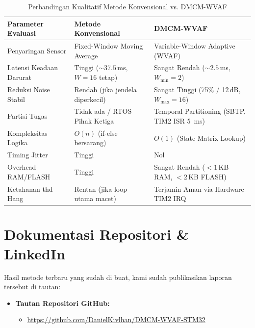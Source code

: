 \documentclass[11pt,a4paper]{article}
\begin{document}
\begin{longtable}
\begin{table}[H]
\centering
\caption{Perbandingan Kualitatif Metode Konvensional vs. DMCM-WVAF}\label{tab:perbandingan}
\vspace{0.2cm}
\begin{tabular}{|>{\centering\arraybackslash}m{4.2cm}|>{\raggedright\arraybackslash}m{6.4cm}|>{\raggedright\arraybackslash}m{6.4cm}|}
\hline
\textbf{Parameter Evaluasi} & \textbf{Metode Konvensional} & \textbf{DMCM-WVAF} \\ \hline
Penyaringan Sensor & Fixed-Window Moving Average & Variable-Window Adaptive (WVAF) \\ \hline
Latensi Keadaan Darurat & Tinggi ($\sim 37.5$\,ms, $W=16$ tetap) & Sangat Rendah ($\sim 2.5$\,ms, $W_{\min}=2$) \\ \hline
Reduksi Noise Stabil & Rendah (jika jendela diperkecil) & Sangat Tinggi (75\% / 12\,dB, $W_{\max}=16$) \\ \hline
Partisi Tugas & Tidak ada / RTOS Pihak Ketiga & Temporal Partitioning (SBTP, TIM2 ISR 5~ms) \\ \hline
Kompleksitas Logika & $O(n)$ (if-else bersarang) & $O(1)$ (State-Matrix Lookup) \\ \hline
Timing Jitter & Tinggi & Nol \\ \hline
Overhead RAM/FLASH & Tinggi & Sangat Rendah ($< 1$\,KB RAM, $< 2$\,KB FLASH) \\ \hline
Ketahanan thd Hang & Rentan (jika loop utama macet) & Terjamin Aman via Hardware TIM2 IRQ \\ \hline
\end{tabular}
\end{table}

\section{Dokumentasi Repositori \& LinkedIn}
\hspace{1.5em}Hasil metode terbaru yang sudah di buat, kami sudah publikasikan laporan tersebut di tautan:
\begin{itemize}

    \item \textbf{Tautan Repositori GitHub:}
    \begin{itemize}
        \item \href{https://github.com/DanielKivlhan/DMCM-WVAF-STM32}
        {https://github.com/DanielKivlhan/DMCM-WVAF-STM32}
    \end{itemize}


\end{itemize}
\end{longtable}
\end{document}
